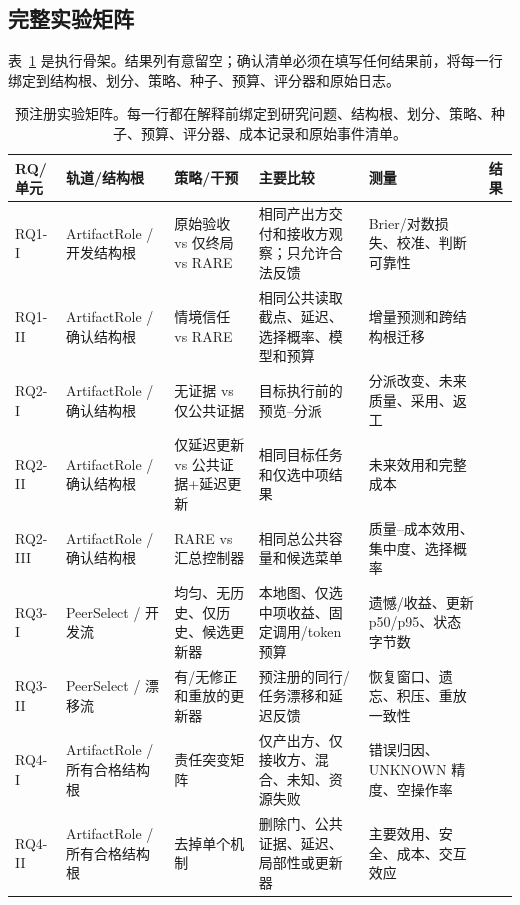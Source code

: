 \documentclass[UTF8,twocolumn]{ctexart}
\newcommand{\blank}{\textemdash}
\begin{document}
\subsection{完整实验矩阵}
表~\ref{tab:matrix} 是执行骨架。结果列有意留空；确认清单必须在填写任何结果前，将每一行绑定到结构根、划分、策略、种子、预算、评分器和原始日志。
\begin{table}[t]
\centering\scriptsize
\begin{tabular}{p{}p{}p{}p{}p{}p{}}
\toprule
RQ/单元 & 轨道/结构根 & 策略/干预 & 主要比较 & 测量 & 结果 \\
\midrule
RQ1-I & ArtifactRole / 开发结构根 & 原始验收 vs 仅终局 vs RARE & 相同产出方交付和接收方观察；只允许合法反馈 & Brier/对数损失、校准、判断可靠性 & \blank \\
RQ1-II & ArtifactRole / 确认结构根 & 情境信任 vs RARE & 相同公共读取截点、延迟、选择概率、模型和预算 & 增量预测和跨结构根迁移 & \blank \\
RQ2-I & ArtifactRole / 确认结构根 & 无证据 vs 仅公共证据 & 目标执行前的预览--分派 & 分派改变、未来质量、采用、返工 & \blank \\
RQ2-II & ArtifactRole / 确认结构根 & 仅延迟更新 vs 公共证据+延迟更新 & 相同目标任务和仅选中项结果 & 未来效用和完整成本 & \blank \\
RQ2-III & ArtifactRole / 确认结构根 & RARE vs 汇总控制器 & 相同总公共容量和候选菜单 & 质量--成本效用、集中度、选择概率 & \blank \\
RQ3-I & PeerSelect / 开发流 & 均匀、无历史、仅历史、候选更新器 & 本地图、仅选中项收益、固定调用/token 预算 & 遗憾/收益、更新 p50/p95、状态字节数 & \blank \\
RQ3-II & PeerSelect / 漂移流 & 有/无修正和重放的更新器 & 预注册的同行/任务漂移和延迟反馈 & 恢复窗口、遗忘、积压、重放一致性 & \blank \\
RQ4-I & ArtifactRole / 所有合格结构根 & 责任突变矩阵 & 仅产出方、仅接收方、混合、未知、资源失败 & 错误归因、UNKNOWN 精度、空操作率 & \blank \\
RQ4-II & ArtifactRole / 所有合格结构根 & 去掉单个机制 & 删除门、公共证据、延迟、局部性或更新器 & 主要效用、安全、成本、交互效应 & \blank \\
\bottomrule
\end{tabular}
\caption{预注册实验矩阵。每一行都在解释前绑定到研究问题、结构根、划分、策略、种子、预算、评分器、成本记录和原始事件清单。}
\label{tab:matrix}
\end{table}
\end{document}
